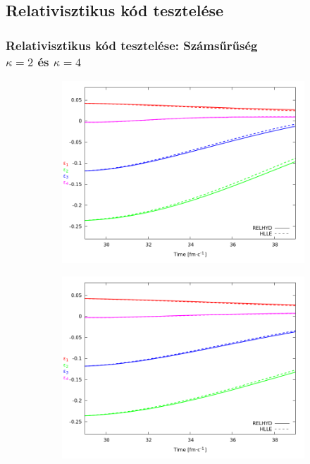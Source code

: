 \documentclass{beamer}
\begin{document}
\subsection{Relativisztikus kód tesztelése}
\begin{frame}
\frametitle{Relativisztikus kód tesztelése: Számsűrűség \\ $\kappa=2$ és $\kappa=4$}
\begin{center}
\begin{figure}[H]
	\centering
    \begin{subfigure}[b]{0.49\textwidth}
    		\includegraphics[width=\textwidth]{pic/res/hr_n_kappa=2}
	\end{subfigure}
	\begin{subfigure}[b]{0.49\textwidth}
        	\includegraphics[width=\textwidth]{pic/res/hr_n_kappa=4}
	\end{subfigure}
\end{figure}
\end{center}
\end{frame}
\end{document}
